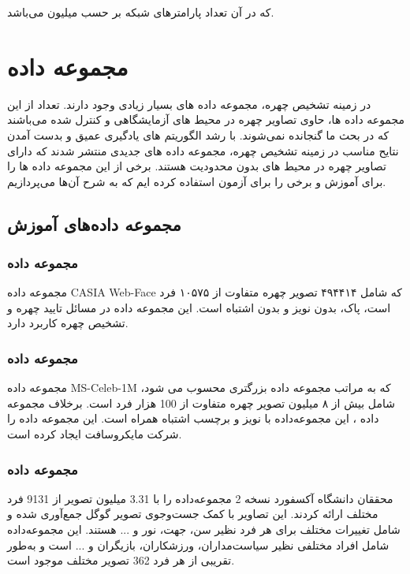 \noindent
که در آن  تعداد پارامترهای شبکه بر حسب میلیون می‌باشد.

\section{مجموعه داده}
در زمینه تشخیص چهره، مجموعه داده های بسیار زیادی وجود دارند. تعداد از این مجموعه داده ها، حاوی تصاویر چهره در محیط های آزمایشگاهی و کنترل شده می‌باشند که در بحث ما گنجانده نمی‌شوند. با رشد الگوریتم های یادگیری عمیق و بدست آمدن نتایح مناسب در زمینه تشخیص چهره، مجموعه داده های جدیدی منتشر شدند که دارای تصاویر چهره در محیط های بدون محدودیت هستند. برخی از این مجموعه داده ها را برای آموزش و برخی را برای آزمون استفاده کرده ایم که به شرح آن‌ها می‌پردازیم.

\subsection{مجموعه داده‌های آموزش}
\subsubsection{مجموعه داده }
مجموعه داده CASIA Web-Face که شامل ۴۹۴۴۱۴ تصویر چهره متفاوت از ۱۰۵۷۵ فرد است، پاک، بدون نویز و بدون اشتباه است. این مجموعه داده در مسائل تایید چهره و تشخیص چهره کاربرد دارد. \cite{CASIA_dataset}

\subsubsection{مجموعه داده }
مجموعه داده MS-Celeb-1M  که به مراتب مجموعه داده بزرگتری محسوب می شود، شامل بیش از ۸ میلیون تصویر چهره متفاوت از 100 هزار فرد است. برخلاف مجموعه داده ، این مجموعه‌داده با نویز و برچسب اشتباه همراه است. این مجموعه داده را شرکت مایکروسافت ایجاد کرده است. \cite{MS_Celeb_dataset}

\subsubsection{مجموعه داده }
محققان دانشگاه آکسفورد نسخه 2 مجموعه‌داده‌  را با 3.31 میلیون تصویر از 9131 فرد مختلف ارائه کردند. این تصاویر با کمک جست‌و‌جوی تصویر گوگل جمع‌آوری ‌شده و شامل تغییرات مختلف برای هر فرد نظیر سن، جهت، نور و ... هستند. این مجموعه‌داده شامل افراد مختلفی نظیر سیاست‌مداران، ورزشکاران، بازیگران و ... است و به‌طور تقریبی از هر فرد 362 تصویر مختلف موجود است. \cite{VGGFace2_dataset}

